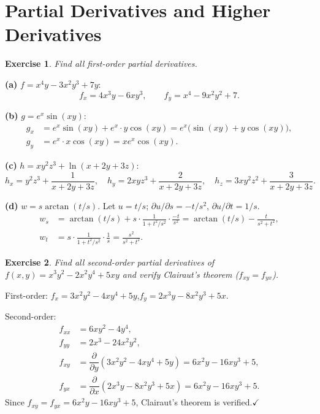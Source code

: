 \documentclass[12pt,a4paper]{article}
\theoremstyle{exstyle}
\newtheorem{exercise}{Exercise}[section]
\newcommand{\pd}[2]{\dfrac{\partial #1}{\partial #2}}
\begin{document}
\section{Partial Derivatives and Higher Derivatives}

\begin{exercise}
Find all first-order partial derivatives.
\end{exercise}
\begin{solbox}
\textbf{(a)} $f=x^4y-3x^2y^3+7y$:
\[
  f_x=4x^3y-6xy^3,\qquad f_y=x^4-9x^2y^2+7.
\]

\textbf{(b)} $g=e^x\sin(xy)$:
\begin{align*}
  g_x &=e^x\sin(xy)+e^x\cdot y\cos(xy)=e^x\bigl(\sin(xy)+y\cos(xy)\bigr),\\
  g_y &=e^x\cdot x\cos(xy)=xe^x\cos(xy).
\end{align*}

\textbf{(c)} $h=xy^2z^3+\ln(x+2y+3z)$:
\[
  h_x=y^2z^3+\frac{1}{x+2y+3z},\quad
  h_y=2xyz^3+\frac{2}{x+2y+3z},\quad
  h_z=3xy^2z^2+\frac{3}{x+2y+3z}.
\]

\textbf{(d)} $w=s\arctan(t/s)$. Let $u=t/s$; $\partial u/\partial s=-t/s^2$, $\partial u/\partial t=1/s$.
\begin{align*}
  w_s&=\arctan(t/s)+s\cdot\frac{1}{1+t^2/s^2}\cdot\frac{-t}{s^2}
       =\arctan(t/s)-\frac{t}{s^2+t^2},\\
  w_t&=s\cdot\frac{1}{1+t^2/s^2}\cdot\frac{1}{s}=\frac{s^2}{s^2+t^2}.
\end{align*}
\end{solbox}

\begin{exercise}
Find all second-order partial derivatives of $f(x,y)=x^3y^2-2x^2y^4+5xy$
and verify Clairaut's theorem ($f_{xy}=f_{yx}$).
\end{exercise}
\begin{solbox}
First-order:
$f_x=3x^2y^2-4xy^4+5y$,\quad $f_y=2x^3y-8x^2y^3+5x$.

Second-order:
\begin{align*}
  f_{xx}&=6xy^2-4y^4,\\
  f_{yy}&=2x^3-24x^2y^2,\\
  f_{xy}&=\pd{}{y}(3x^2y^2-4xy^4+5y)=6x^2y-16xy^3+5,\\
  f_{yx}&=\pd{}{x}(2x^3y-8x^2y^3+5x)=6x^2y-16xy^3+5.
\end{align*}
Since $f_{xy}=f_{yx}=6x^2y-16xy^3+5$, Clairaut's theorem is verified.\hfill$\checkmark$
\end{solbox}
\end{document}
